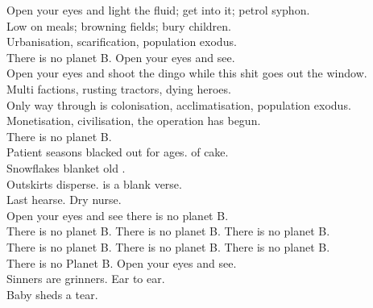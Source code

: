 
\label{album:infest-the-rats-nest}




Open your eyes and light the fluid; get into it; petrol syphon. \\
Low on meals; browning fields; bury children. \\
Urbanisation, scarification, population exodus. \\
There is no planet B. Open your eyes and see. \\

Open your eyes and shoot the dingo while this shit goes out the window. \\
Multi factions, rusting tractors, dying heroes. \\

Only way through is colonisation, acclimatisation, population exodus. \\
Monetisation, civilisation, the operation has begun. \\
There is no planet B. \\

Patient seasons blacked out for ages.  of cake. \\
Snowflakes blanket old . \\
Outskirts disperse.  is a blank verse. \\
Last hearse. Dry nurse. \\

Open your eyes and see there is no planet B. \\
There is no planet B. There is no planet B. There is no planet B. \\
There is no planet B. There is no planet B. There is no planet B. \\
There is no Planet B. Open your eyes and see. \\

Sinners are grinners. Ear to ear. \\
Baby  sheds a tear. \\



